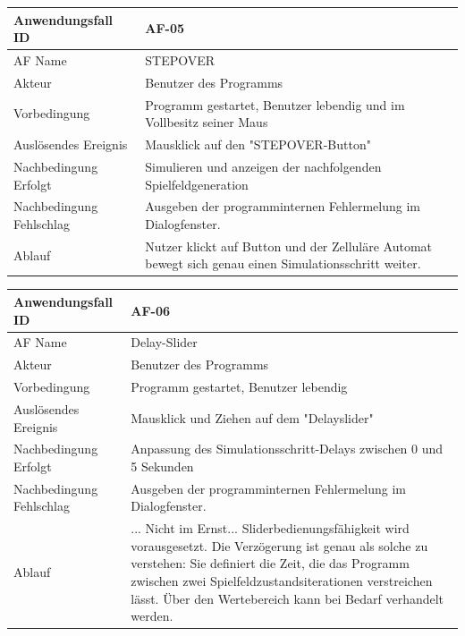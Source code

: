 \documentclass[11pt,a4paper]{article}
\begin{document}
\begin{tabular}[m]{|m{7cm}|m{9cm}|}
    \hline
    Anwendungsfall ID     & AF-05 \\
         \hline
    AF Name     &  STEPOVER \\
         \hline
    Akteur&Benutzer des Programms \\
    \hline
    Vorbedingung&Programm gestartet, Benutzer lebendig und im Vollbesitz seiner Maus\\
    \hline
    Auslösendes Ereignis&Mausklick auf den "STEPOVER-Button"\\
    \hline
    Nachbedingung Erfolgt& Simulieren und anzeigen der nachfolgenden Spielfeldgeneration\\
    \hline
    Nachbedingung Fehlschlag&Ausgeben der programminternen Fehlermelung im Dialogfenster.\\
    \hline
    Ablauf&Nutzer klickt auf Button und der Zelluläre Automat bewegt sich genau einen Simulationsschritt weiter.\\
    \hline
\end{tabular}
\par


\begin{tabular}[m]{|m{7cm}|m{9cm}|}
    \hline
    Anwendungsfall ID     & AF-06 \\
         \hline
    AF Name     &  Delay-Slider\\
         \hline
    Akteur&Benutzer des Programms \\
    \hline
    Vorbedingung&Programm gestartet, Benutzer lebendig\\
    \hline
    Auslösendes Ereignis& Mausklick und Ziehen auf dem "Delayslider"\\
    \hline
    Nachbedingung Erfolgt&Anpassung des Simulationsschritt-Delays zwischen 0 und 5 Sekunden\\
    \hline
    Nachbedingung Fehlschlag& Ausgeben der programminternen Fehlermelung im Dialogfenster.\\
    \hline
    Ablauf&... Nicht im Ernst... Sliderbedienungsfähigkeit wird vorausgesetzt. \newline Die Verzögerung ist genau als solche zu verstehen: Sie definiert die Zeit, die das Programm zwischen zwei Spielfeldzustandsiterationen verstreichen lässt. Über den Wertebereich kann bei Bedarf verhandelt werden.
    \\
    \hline
\end{tabular}
\par
\end{document}
